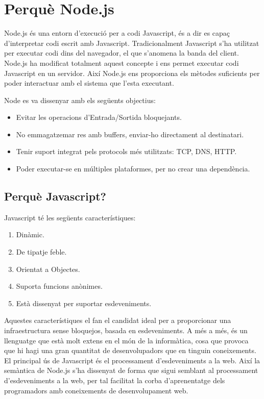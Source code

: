 \chapter{Perquè Node.js}
\label{sec:node.js-full}

Node.js és una entorn d'execució per a codi Javascript, és a dir es capaç d'interpretar codi escrit amb Javascript. Tradicionalment Javascript s'ha utilitzat per executar codi dins del navegador, el que s'anomena la banda del client. Node.js ha modificat totalment aquest concepte i ens permet executar codi Javascript en un servidor. Així Node.js ens proporciona els mètodes suficients per poder interactuar amb el sistema que l'esta executant.

Node es va dissenyar amb els següents objectius: 

\begin{itemize}
    \item{Evitar les operacions d'Entrada/Sortida bloquejants.}
    \item{No emmagatzemar res amb buffers, enviar-ho directament al destinatari.}
    \item{Tenir suport integrat pels protocols més utilitzats: TCP, DNS, HTTP.}
    \item{Poder executar-se en múltiples plataformes, per no crear una dependència.}
\end{itemize}

\section{Perquè Javascript?}

Javascript té les següents característiques: 

\begin{enumerate}
    \item{Dinàmic.}
    \item{De tipatje feble.}
    \item{Orientat a Objectes.}
    \item{Suporta funcions anònimes.}
    \item{Està dissenyat per suportar esdeveniments.}
\end{enumerate}

Aquestes característiques el fan el candidat ideal per a proporcionar una infraestructura sense bloquejos, basada en esdeveniments. A més a més, és un llenguatge que està molt extens en el món de la informàtica, cosa que provoca que hi hagi una gran quantitat de desenvolupadors que en tinguin coneixements. El principal ús de Javascript és el processament d'esdeveniments a la web. Així la semàntica de Node.js s'ha dissenyat de forma que sigui semblant al processament d'esdeveniments a la web, per tal facilitat la corba d'aprenentatge dels programadors amb coneixements de desenvolupament web.

